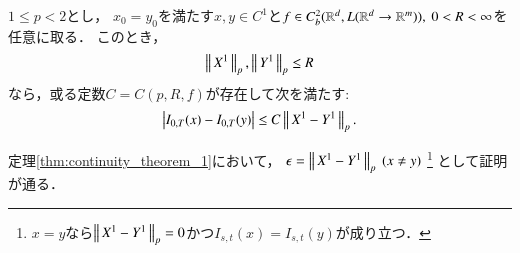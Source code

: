 	\begin{screen}
		\begin{cor}[$p$-variationによる閉球上のLipschitz連続性]\label{cor:continuity_theorem_1}
			$1 \leq p < 2$とし，
			$x_0 = y_0$を満たす$x,y \in C^1$と$f \in C^2_b(\mathbb{R}^d,L(\mathbb{R}^d \rightarrow \mathbb{R}^m)),\ 0 < R < \infty$を任意に取る．
			このとき，
			\begin{align}
				\left\|\, X^1\, \right\|_{p},\left\|\, Y^1\, \right\|_{p} \leq R
			\end{align}
			なら，或る定数$C = C(p,R,f)$が存在して次を満たす:
			\begin{align}
				\left| I_{0,T}(x) - I_{0,T}(y) \right| \leq C\left\|\, X^1 - Y^1\, \right\|_{p}.
			\end{align}
		\end{cor}
	\end{screen}
	
	\begin{prf}
		定理\ref{thm:continuity_theorem_1}において，
		$\epsilon = \left\|\, X^1 - Y^1\, \right\|_{p}\ (x \neq y)$
		\footnote{
			$x=y$なら$\left\|\, X^1 - Y^1\, \right\|_{p} = 0$かつ$I_{s,t}(x) = I_{s,t}(y)$が成り立つ．
		}
		として証明が通る．
		\QED
	\end{prf}
	
